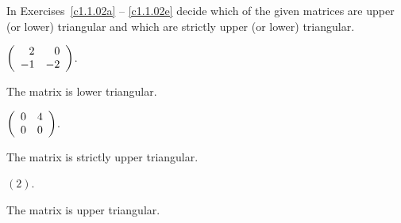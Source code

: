 \documentclass{ximera}
\begin{document}
\noindent In Exercises~\ref{c1.1.02a} -- \ref{c1.1.02e} decide which
of the given matrices are upper (or lower) triangular and which are
strictly upper (or lower) triangular.

\begin{exercise} \label{c1.1.02a}
  $\left(\begin{array}{rr} 2 & 0\\ -1 &-2\end{array}\right)$.
  \begin{multipleChoice}
  \end{multipleChoice}  

\begin{solution}
The matrix is lower triangular.

\end{solution}
\end{exercise}
\begin{exercise} \label{c1.1.02b}
  $\left(\begin{array}{rr} 0 & 4\\ 0 &0\end{array}\right)$.
  \begin{multipleChoice}
  \end{multipleChoice}

\begin{solution}
The matrix is strictly upper triangular.

\end{solution}
\end{exercise}
\begin{exercise} \label{c1.1.02c}
  $(2)$.
  \begin{multipleChoice}
  \end{multipleChoice}  

\begin{solution}
The matrix is upper triangular.

\end{solution}
\end{exercise}
\end{document}
